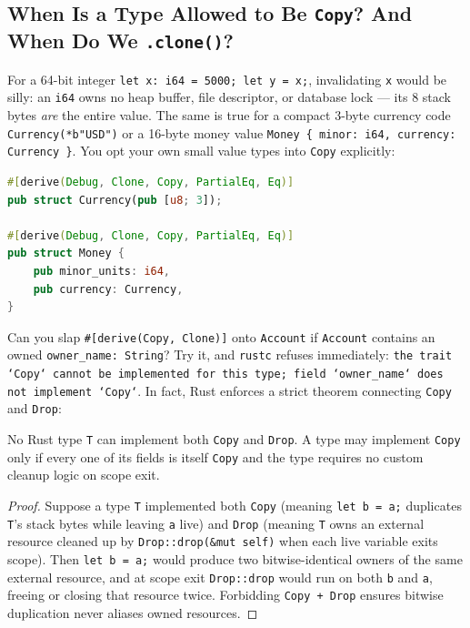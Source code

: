\subsection{When Is a Type Allowed to Be \texttt{Copy}? And When Do We \texttt{.clone()}?}

For a 64-bit integer \texttt{let x: i64 = 5000; let y = x;}, invalidating \texttt{x} would be silly: an \texttt{i64} owns no heap buffer, file descriptor, or database lock --- its 8 stack bytes \emph{are} the entire value. The same is true for a compact 3-byte currency code \texttt{Currency(*b"USD")} or a 16-byte money value \texttt{Money \{ minor: i64, currency: Currency \}}. You opt your own small value types into \texttt{Copy} explicitly:

\begin{lstlisting}[language=Rust]
#[derive(Debug, Clone, Copy, PartialEq, Eq)]
pub struct Currency(pub [u8; 3]);

#[derive(Debug, Clone, Copy, PartialEq, Eq)]
pub struct Money {
    pub minor_units: i64,
    pub currency: Currency,
}
\end{lstlisting}

Can you slap \texttt{\#[derive(Copy, Clone)]} onto \texttt{Account} if \texttt{Account} contains an owned \texttt{owner\_name: String}? Try it, and \texttt{rustc} refuses immediately: \texttt{the trait `Copy` cannot be implemented for this type; field `owner\_name` does not implement `Copy`}. In fact, Rust enforces a strict theorem connecting \texttt{Copy} and \texttt{Drop}:

\begin{theorem}
\label{ch03:thm-copy-xor-drop}
No Rust type \texttt{T} can implement both \texttt{Copy} and \texttt{Drop}. A type may implement \texttt{Copy} only if every one of its fields is itself \texttt{Copy} and the type requires no custom cleanup logic on scope exit.
\end{theorem}

\begin{proof}
Suppose a type \texttt{T} implemented both \texttt{Copy} (meaning \texttt{let b = a;} duplicates \texttt{T}'s stack bytes while leaving \texttt{a} live) and \texttt{Drop} (meaning \texttt{T} owns an external resource cleaned up by \texttt{Drop::drop(\&mut self)} when each live variable exits scope). Then \texttt{let b = a;} would produce two bitwise-identical owners of the same external resource, and at scope exit \texttt{Drop::drop} would run on both \texttt{b} and \texttt{a}, freeing or closing that resource twice. Forbidding \texttt{Copy + Drop} ensures bitwise duplication never aliases owned resources.
\end{proof}

